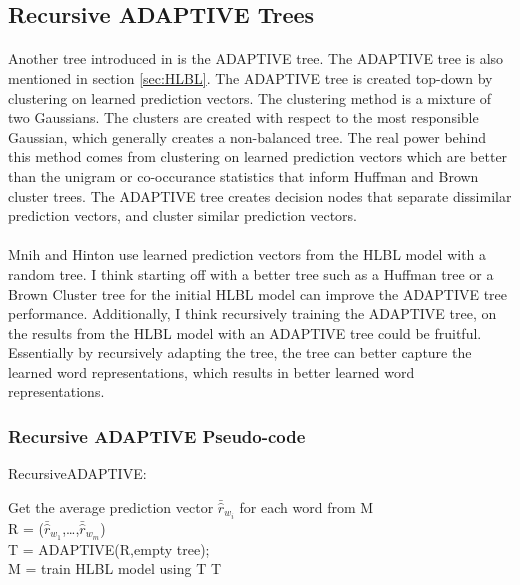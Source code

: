 \subsection{Recursive ADAPTIVE Trees}
\paragraph{}
Another tree introduced in \cite{MnihHinton2009} is the ADAPTIVE tree. The ADAPTIVE tree is also mentioned in section \ref{sec:HLBL}. The ADAPTIVE tree is created top-down by clustering on learned prediction vectors. The clustering method is a mixture of two Gaussians. The clusters are created with respect to the most responsible Gaussian, which generally creates a non-balanced tree. The real power behind this method comes from clustering on learned prediction vectors which are better than the unigram or co-occurance statistics that inform Huffman and Brown cluster trees. The ADAPTIVE tree creates decision nodes that separate dissimilar prediction vectors, and cluster similar prediction vectors. 

\paragraph{}
Mnih and Hinton use learned prediction vectors from the HLBL model with a random tree. I think starting off with a better tree such as a Huffman tree or a Brown Cluster tree for the initial HLBL model can improve the ADAPTIVE tree performance. Additionally, I think recursively training the ADAPTIVE tree, on the results from the HLBL model with an ADAPTIVE tree could be fruitful. Essentially by recursively adapting the tree, the tree can better capture the learned word representations, which results in better learned word representations. 
\subsubsection{Recursive ADAPTIVE Pseudo-code}

\begin{algorithm}
\SetAlgoLined
RecursiveADAPTIVE: \\

 {
 	Get the average prediction vector $\bar{\hat{r}}_{w_i}$ for each word from M
 	\\R = ($\bar{\hat{r}}_{w_1}$,\dots,$\bar{\hat{r}}_{w_m}$)
	\\T = ADAPTIVE(R,empty tree);
	\\M = train HLBL model using T
}
\Return T
\end{algorithm}

